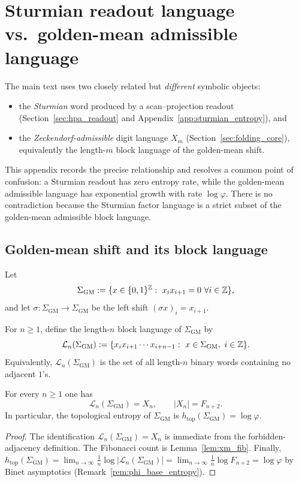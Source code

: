 \section{Sturmian readout language vs.\ golden-mean admissible language}
\label{app:sturmian_vs_golden_mean}
\noindent
The main text uses two closely related but \emph{different} symbolic objects:
\begin{itemize}
  \item the \emph{Sturmian} word produced by a scan--projection readout
  (Section~\ref{sec:hpa_readout} and Appendix~\ref{app:sturmian_entropy}), and
  \item the \emph{Zeckendorf-admissible} digit language $X_m$
  (Section~\ref{sec:folding_core}), equivalently the length-$m$ block language
  of the golden-mean shift.
\end{itemize}
This appendix records the precise relationship and resolves a common point
of confusion: a Sturmian readout has zero entropy rate, while the
golden-mean admissible language has exponential growth with rate $\log\varphi$.
There is no contradiction because the Sturmian factor language is a strict
subset of the golden-mean admissible block language.

\subsection{Golden-mean shift and its block language}
\label{app:golden_mean_shift_def}
\begin{definition}
\label{def:golden_mean_shift}
Let
\[
\Sigma_{\mathrm{GM}}
:=\{x\in\{0,1\}^{\mathbb{Z}}:\ x_i x_{i+1}=0\ \forall i\in\mathbb{Z}\},
\]
and let $\sigma:\Sigma_{\mathrm{GM}}\to\Sigma_{\mathrm{GM}}$ be the left shift
$(\sigma x)_i=x_{i+1}$.
\end{definition}

\begin{definition}
\label{def:block_language}
For $n\ge 1$, define the length-$n$ block language of $\Sigma_{\mathrm{GM}}$ by
\[
\mathcal{L}_n(\Sigma_{\mathrm{GM}})
:=\{x_i x_{i+1}\cdots x_{i+n-1}:\ x\in\Sigma_{\mathrm{GM}},\ i\in\ZZ\}.
\]
Equivalently, $\mathcal{L}_n(\Sigma_{\mathrm{GM}})$ is the set of all
length-$n$ binary words containing no adjacent $1$'s.
\end{definition}

\begin{lemma}
\label{lem:golden_mean_language_equals_Xn}
For every $n\ge 1$ one has
\[
\mathcal{L}_n(\Sigma_{\mathrm{GM}})=X_n,
\qquad
|X_n|=F_{n+2}.
\]
In particular, the topological entropy of $\Sigma_{\mathrm{GM}}$ is
$h_{\mathrm{top}}(\Sigma_{\mathrm{GM}})=\log\varphi$.
\end{lemma}
\begin{proof}
The identification $\mathcal{L}_n(\Sigma_{\mathrm{GM}})=X_n$ is immediate from
the forbidden-adjacency definition.
The Fibonacci count is Lemma~\ref{lem:xm_fib}.
Finally,
$h_{\mathrm{top}}(\Sigma_{\mathrm{GM}})
=\lim_{n\to\infty}\frac{1}{n}\log|\mathcal{L}_n(\Sigma_{\mathrm{GM}})|
=\lim_{n\to\infty}\frac{1}{n}\log F_{n+2}
=\log\varphi$
by Binet asymptotics (Remark~\ref{rem:phi_base_entropy}).
\end{proof}

